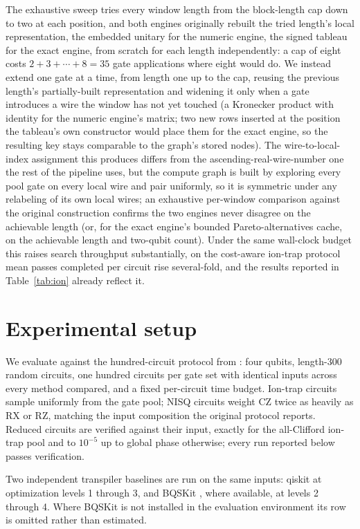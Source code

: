 \documentclass[11pt]{article}
\begin{document}
The exhaustive sweep tries every window length from the block-length cap
down to two at each position, and both engines originally rebuilt the
tried length's local representation, the embedded unitary for the numeric
engine, the signed tableau for the exact engine, from scratch for each
length independently: a cap of eight costs $2+3+\cdots+8=35$ gate
applications where eight would do. We instead extend one gate at a time,
from length one up to the cap, reusing the previous length's
partially-built representation and widening it only when a gate introduces
a wire the window has not yet touched (a Kronecker product with identity
for the numeric engine's matrix; two new rows inserted at the position the
tableau's own constructor would place them for the exact engine, so the
resulting key stays comparable to the graph's stored nodes). The
wire-to-local-index assignment this produces differs from the
ascending-real-wire-number one the rest of the pipeline uses, but the
compute graph is built by exploring every pool gate on every local wire
and pair uniformly, so it is symmetric under any relabeling of its own
local wires; an exhaustive per-window comparison against the original
construction confirms the two engines never disagree on the achievable
length (or, for the exact engine's bounded Pareto-alternatives cache, on
the achievable length and two-qubit count). Under the same wall-clock
budget this raises search throughput substantially, on the cost-aware
ion-trap protocol mean passes completed per circuit rise several-fold, and
the results reported in Table~\ref{tab:ion} already reflect it.

\section{Experimental setup}
\label{sec:setup}

We evaluate against the hundred-circuit protocol from
\cite{Rosenhahn2025Optimization}: four qubits, length-300 random circuits,
one hundred circuits per gate set with identical inputs across every
method compared, and a fixed per-circuit time budget. Ion-trap circuits
sample uniformly from the gate pool; NISQ circuits weight CZ twice as
heavily as RX or RZ, matching the input composition the original
protocol reports. Reduced circuits are verified against their input,
exactly for the all-Clifford ion-trap pool and to $10^{-5}$ up to global
phase otherwise; every run reported below passes verification.

Two independent transpiler baselines are run on the same inputs: qiskit
\cite{JavadiAbhari2024Qiskit} at optimization levels 1 through 3, and
BQSKit \cite{Younis2021BQSKit}, where available, at levels 2 through 4.
Where BQSKit is not installed in the evaluation environment its row is
omitted rather than estimated.
\end{document}
